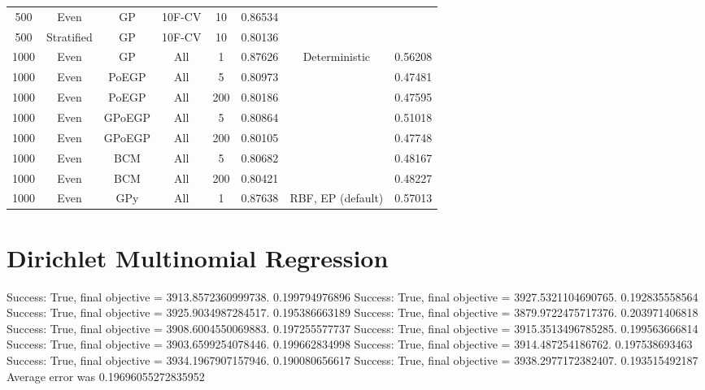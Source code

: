 \begin{tabular}{|c|c|c|c|c|c|c|c|}
    \hline
    500     & Even       & GP     & 10F-CV & 10        & 0.86534    &                     &         \\
    500     & Stratified & GP     & 10F-CV & 10        & 0.80136    &                     &         \\
    1000    & Even       & GP     & All    & 1         & 0.87626    & Deterministic       & 0.56208 \\
    1000    & Even       & PoEGP  & All    & 5         & 0.80973    &                     & 0.47481 \\
    1000    & Even       & PoEGP  & All    & 200       & 0.80186    &                     & 0.47595 \\
    1000    & Even       & GPoEGP & All    & 5         & 0.80864    &                     & 0.51018 \\
    1000    & Even       & GPoEGP & All    & 200       & 0.80105    &                     & 0.47748 \\
    1000    & Even       & BCM    & All    & 5         & 0.80682    &                     & 0.48167 \\
    1000    & Even       & BCM    & All    & 200       & 0.80421    &                     & 0.48227 \\
    1000    & Even       & GPy    & All    & 1         & 0.87638    & RBF, EP (default)   & 0.57013 \\
    \hline
\end{tabular}


\section{Dirichlet Multinomial Regression}

Success: True, final objective = 3913.8572360999738.
0.199794976896
Success: True, final objective = 3927.5321104690765.
0.192835558564
Success: True, final objective = 3925.9034987284517.
0.195386663189
Success: True, final objective = 3879.9722475717376.
0.203971406818
Success: True, final objective = 3908.6004550069883.
0.197255577737
Success: True, final objective = 3915.3513496785285.
0.199563666814
Success: True, final objective = 3903.6599254078446.
0.199662834998
Success: True, final objective = 3914.487254186762.
0.197538693463
Success: True, final objective = 3934.1967907157946.
0.190080656617
Success: True, final objective = 3938.2977172382407.
0.193515492187
Average error was 0.19696055272835952

